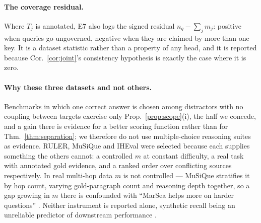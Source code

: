 \documentclass{article}
\begin{document}
\paragraph{The coverage residual.} Where $T_j$ is annotated, E7 also logs the signed residual
$n_q-\sum_j m_j$: positive when queries go ungoverned, negative when they are claimed by more
than one key. It is a dataset statistic rather than a property of any head, and it is reported
because Cor.~\ref{cor:joint}'s consistency hypothesis is exactly the case where it is zero.

\paragraph{Why these three datasets and not others.} Benchmarks in which one correct answer is
chosen among distractors with no coupling between targets exercise only
Prop.~\ref{prop:scope}(i), the half we concede, and a gain there is evidence for a better scoring
function rather than for Thm.~\ref{thm:separation}; we therefore do not use multiple-choice
reasoning suites as evidence. RULER, MuSiQue and IHEval were selected because each supplies
something the others cannot: a controlled $m$ at constant difficulty, a real task with annotated
gold evidence, and a ranked order over conflicting sources respectively. In real multi-hop data
$m$ is not controlled --- MuSiQue stratifies it by hop count, varying gold-paragraph count and
reasoning depth together, so a gap growing in $m$ there is confounded with ``MarSea helps more on
harder questions'' \citep{min2019compositional}. Neither instrument is reported alone, synthetic
recall being an unreliable predictor of downstream performance \citep{yen2025helmet}.
\end{document}
